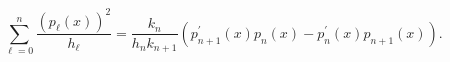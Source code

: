 \[\sum_{\ell=0}^{n}\frac{(p_{\ell}(x))^{2}}{h_{\ell}}=\frac{k_{n}}{h_{n}k_{n+1}}%
{\left(p_{n+1}^{\prime}(x)p_{n}(x)-p_{n}^{\prime}(x)p_{n+1}(x)\right)}.\]